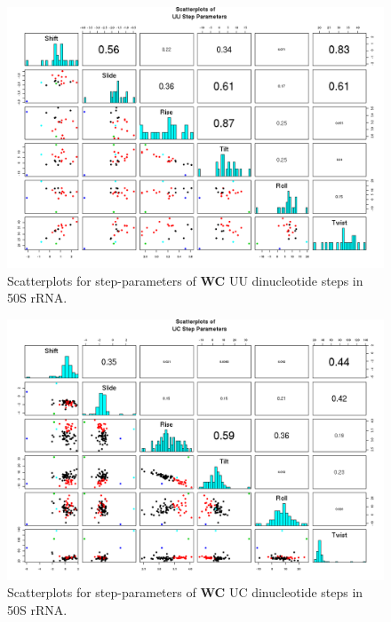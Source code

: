 \begin{figure}[H]
\centering
\includegraphics[angle=90, scale=0.6]{WC/UU.png}
\caption{Scatterplots for step-parameters of \textbf{WC} UU dinucleotide steps
in 50S rRNA.}
\label{fig:stepsUU}
\end{figure}

\begin{figure}[H]
\centering
\includegraphics[angle=90, scale=0.6]{WC/UC.png}
\caption{Scatterplots for step-parameters of \textbf{WC} UC dinucleotide steps
in 50S rRNA.}
\label{fig:stepsUC}
\end{figure}

